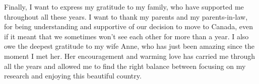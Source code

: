 Finally, I want to express my gratitude to my family, who have supported me
throughout all these years. I want to thank my parents and my parents-in-law,
for being understanding and supportive of our decision to move to Canada, even
if it meant that we sometimes won't see each other for more than a year.
I also owe the deepest gratitude to my wife Anne, who has just been amazing
since the moment I met her. Her encouragement and warming love has carried me
through all the years and allowed me to find the right balance between focusing
on my research and enjoying this beautiful country.
